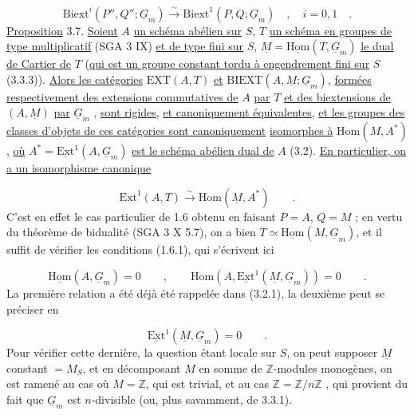 \begin{equation}\tag{3.6.2}
\mathrm{Biext}^i(P'',Q'';\underline{G}_m) \stackrel{\sim}{\longrightarrow} \mathrm{Biext}^1(P,Q;\underline{G}_m) \quad , \quad i = 0, 1 \quad .
\end{equation}
\underline{Proposition} 3.7. \underline{Soient} $A$ \underline{un schéma abélien sur} $S$, $T$ \underline{un schéma en groupes de type multiplicatif} (SGA 3 IX) \underline{et de type fini sur} $S$, $\underline{M}=\underline{\mathrm{Hom}}(T,\underline{G}_m)$ \underline{le dual de Cartier de} $T$ (\underline{qui est un groupe constant tordu à engendrement fini sur} $S$ (3.3.3)). \underline{Alors les catégories} $\mathrm{EXT}(A,T)$ \underline{et} $\mathrm{BIEXT}(A,\underline{M}; \underline{G}_m)$, \underline{formées respectivement des extensions commutatives de} $A$ \underline{par} $T$ \underline{et des biextensions de} $(A,\underline{M})$ \underline{par} $\underline{G}_m$ , \underline{sont rigides}, \underline{et canoniquement équivalentes},
\underline{et les groupes des classes d'objets de ces catégories sont canoniquement} \underline{isomorphes à} $\mathrm{Hom}(M,A^*)$, \underline{où} $A^* = \underline{\mathrm{Ext}}^1(A,\underline{G}_m)$ \underline{est le schéma abélien dual de} $A$ (3.2). \underline{En particulier, on a un isomorphisme canonique}

\begin{equation}\tag{3.7.1}
\mathrm{Ext}^1(A,T) \stackrel{\sim}{\longrightarrow} \mathrm{Hom}(\underline{M},A^*) \qquad .
\end{equation}
C'est en effet le cas particulier de 1.6 obtenu en faisant $P = A$, $Q = M$ ; en vertu du théorème de bidualité (SGA 3 X 5.7), on a bien $T \simeq \underline{\mathrm{Hom}}(M,\underline{G}_m)$, et il suffit de vérifier les conditions (1.6.1), qui s'écrivent ici

\begin{equation*}
\underline{\mathrm{Hom}}(A,\underline{G}_m) = 0 \qquad , \qquad \mathrm{Hom}(A,\underline{\mathrm{Ext}}^1(\underline{M},\underline{G}_m)) = 0 \qquad .
\end{equation*}
La première relation a été déjà été rappelée dans (3.2.1), la deuxième peut se préciser en

\begin{equation*}
\underline{\mathrm{Ext}}^1(\underline{M},\underline{G}_m) = 0 \qquad .
\end{equation*}
Pour vérifier cette dernière, la question étant locale sur $S$, on peut supposer $\underline{M}$ constant $= M_S$, et en décomposant $M$ en somme de $\mathbb{Z}$-modules monogènes, on est ramené au cas où $M = \mathbb{Z}$, qui est trivial, et au cas $\mathbb{Z} = \mathbb{Z}/n\mathbb{Z}$ , qui provient du fait que $\underline{G}_m$ est $n$-divisible (ou, plus savamment, de 3.3.1).

